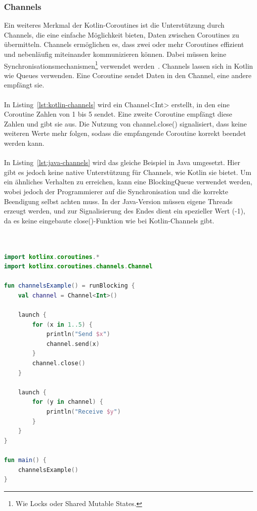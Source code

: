 \documentclass[11pt]{article}
\begin{document}
    \subsubsection{Channels}
    Ein weiteres Merkmal der Kotlin-Coroutines ist die Unterstützung durch Channels, die eine einfache Möglichkeit bieten, Daten zwischen Coroutines zu übermitteln.
    Channels ermöglichen es, dass zwei oder mehr Coroutines effizient und nebenläufig miteinander kommunizieren können.
    Dabei müssen keine Synchronisationsmechanismen\footnote{Wie Locks oder Shared Mutable States.} verwendet werden~\cite[208]{kotlin-patterns}.
    Channels lassen sich in Kotlin wie Queues verwenden.
    Eine Coroutine sendet Daten in den Channel, eine andere empfängt sie.\\
    \\
    In Listing~\ref{lst:kotlin-channels} wird ein Channel<Int> erstellt, in den eine Coroutine Zahlen von 1 bis 5 sendet.
    Eine zweite Coroutine empfängt diese Zahlen und gibt sie aus.
    Die Nutzung von channel.close() signalisiert, dass keine weiteren Werte mehr folgen, sodass die empfangende Coroutine korrekt beendet werden kann.\\
    \\
    In Listing~\ref{lst:java-channels} wird das gleiche Beispiel in Java umgesetzt.
    Hier gibt es jedoch keine native Unterstützung für Channels, wie Kotlin sie bietet.
    Um ein ähnliches Verhalten zu erreichen, kann eine BlockingQueue verwendet werden, wobei jedoch der Programmierer auf die Synchronisation und die korrekte Beendigung selbst achten muss.
    In der Java-Version müssen eigene Threads erzeugt werden, und zur Signalisierung des Endes dient ein spezieller Wert (-1), da es keine eingebaute close()-Funktion wie bei Kotlin-Channels gibt.\\
    \\

    \begin{lstlisting}[language=Kotlin, caption={Channels.kt}, label={lst:kotlin-channels}]

import kotlinx.coroutines.*
import kotlinx.coroutines.channels.Channel

fun channelsExample() = runBlocking {
    val channel = Channel<Int>()

    launch {
        for (x in 1..5) {
            println("Send $x")
            channel.send(x)
        }
        channel.close()
    }

    launch {
        for (y in channel) {
            println("Receive $y")
        }
    }
}

fun main() {
    channelsExample()
}
    \end{lstlisting}
\end{document}
